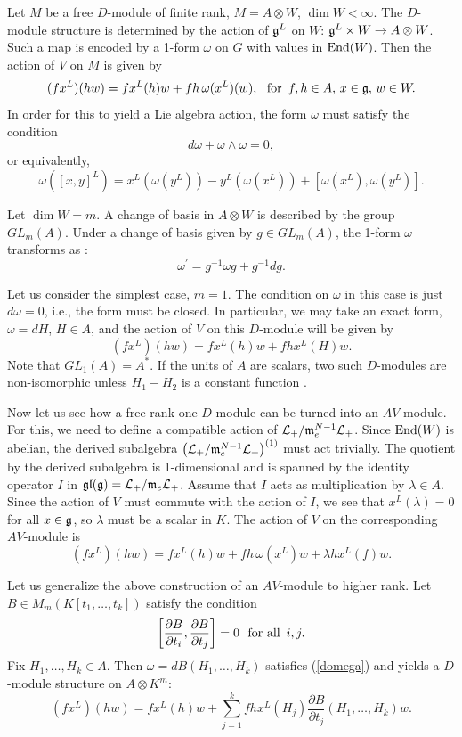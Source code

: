 \documentclass[12pt]{amsart}
\begin{document}
Let $M$ be a free $D$-module of finite rank, $M = A \otimes W$, $\dim W < \infty$. The $D$-module structure is determined by the action of $\mathfrak{g}^L$ on $W$: $\mathfrak{g}^L \times W \rightarrow A \otimes W$.
Such a map is encoded by a 1-form $\omega$ on $G$ with values in $\textup{End}(W)$. Then the action of $V$ on $M$ is given by
$$(f x^L) (h w) = f x^L(h)  w + fh \,\omega(x^L)(w), \ \ \text{for \,} f,h\in A, \,x\in \mathfrak{g}, \,w\in W.$$ 
In order for this to yield a Lie algebra action, the form $\omega$ must satisfy the condition
\begin{equation}
\label{domega}
d \omega + \omega \wedge \omega = 0,
\end{equation}
or equivalently,
$$\omega([x,y]^L) = x^L (\omega(y^L)) -  y^L (\omega(x^L)) + [\omega(x^L), \omega(y^L)].$$ 

Let $\dim W = m$. A change of basis in $A \otimes W$ is described by the group $GL_m(A)$. Under a change of basis given by $g \in GL_m(A)$, the 1-form $\omega$ transforms as \cite{Bo}: 
$$\omega^\prime = g^{-1} \omega g + g^{-1} dg.$$

Let us consider the simplest case, $m = 1$. The condition on $\omega$ in this case is just $d \omega = 0$, i.e., the form must be closed. In particular, we may take an exact form, $\omega = dH$, $H \in A$, and the action of $V$ on this $D$-module will be given by
$$(f x^L) (h w) = f x^L(h) w + fh x^L(H) w.$$
Note that $GL_1 (A) = A^*$. If the units of $A$ are scalars, two such $D$-modules are non-isomorphic unless $H_1 - H_2$ is a constant function \cite{BF}.

Now let us see how a free rank-one $ D$-module can be turned into an $AV$-module. For this, we need to define a compatible action of ${\mathcal L}_+ / \mathfrak{m}_e^{N-1} {\mathcal L}_+$. Since $\textup{End}(W)$ is abelian, the derived subalgebra
$\left( {\mathcal L}_+ / \mathfrak{m}_e^{N-1} {\mathcal L}_+ \right)^{(1)}$ must act trivially. The quotient by the derived subalgebra is 1-dimensional and is spanned by the identity operator $I$ in $\mathfrak{gl}(\mathfrak{g}) = {\mathcal L}_+ / \mathfrak{m}_e {\mathcal L}_+$. Assume that $I$ acts as multiplication by $\lambda \in A$. Since the action of $V$ must commute with the action of $I$, we see that $x^L(\lambda) = 0$ for all $x \in \mathfrak{g}$, so $\lambda$ must be a scalar in $K$.
The action of $V$ on the corresponding $AV$-module is 
$$(f x^L) (h w) = f x^L(h) w + fh\, \omega(x^L) w + \lambda h x^L(f) w.$$

Let us generalize the above construction of an $AV$-module to higher rank. Let $B \in M_m(K[t_1,\ldots, t_k])$ satisfy the condition
\begin{equation}
\label{commute}
\left[ \frac{\partial B}{\partial t_i},  \frac{\partial B}{\partial t_j} \right] = 0 \ \ \text{for all \,} i,j.
\end{equation}
Fix $H_1, \ldots, H_k \in A$. Then $\omega = dB(H_1, \ldots, H_k)$ satisfies (\ref{domega}) and yields a $D$-module structure on $A \otimes K^m$:
\begin{equation}
\label{Dmod}
(f x^L)(hw) = f x^L(h) w + \sum_{j=1}^k fh x^L(H_j) \frac{\partial B}{\partial t_j} (H_1, \ldots, H_k) w.
\end{equation}
\end{document}
